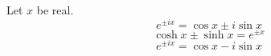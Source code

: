 \documentclass{article}
\newcommand{\ipm}{\pm i}
\begin{document}
Let $x$ be real.
\begin{equation}
e^{\ipm x} = \cos x \ipm \sin x
\label{eq:m1}
\end{equation}
\begin{equation}
\cosh x \pm \sinh x = e^{\pm x}
\label{eq:m2}
\end{equation}
\begin{equation}
e^{\ipm x} = \cos x - i\sin x
\label{eq:m3}
\end{equation}
\end{document}
